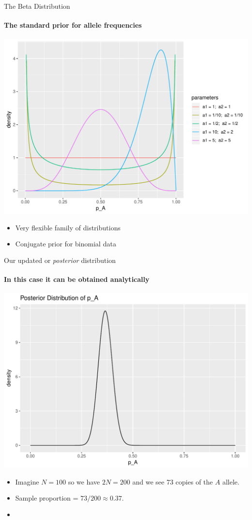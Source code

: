 \documentclass[letter,graphicx]{beamer}
\begin{document}
\begin{frame}{The Beta Distribution}
\framesubtitle{The standard prior for allele frequencies}

\begin{center}
\includegraphics[width=.75\textwidth]{../figures/beta_densities.pdf}
\end{center}
\begin{itemize}
\item Very flexible family of distributions
\item Conjugate prior for binomial data
\end{itemize}
\end{frame}





\begin{frame}{Our updated or {\em posterior} distribution}
\framesubtitle{In this case it can be obtained analytically}
\begin{center}
\includegraphics[height=.55\textheight]{../figures/pa_posterior.pdf}
\end{center}
\begin{itemize}
\item Imagine $N=100$ so we have $2N=200$ and we see 73 copies of the $A$ allele. 
\item Sample proportion = $73/200 \approx 0.37$.
\item {}
\end{itemize}
\end{frame}
\end{document}
